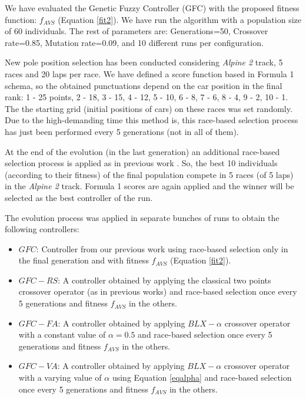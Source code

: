 \documentclass[conference]{IEEEtran}
\begin{document}
We have evaluated the Genetic Fuzzy Controller (GFC) with the proposed fitness function: $f_{AVS}$ (Equation \ref{fit2}). We have run the algorithm with a population size of 60 individuals. The rest of parameters are: Generations=50, Crossover rate=0.85, Mutation rate=0.09, and 10 different runs per configuration.

New pole position selection has been conducted considering \textit{Alpine 2} track, 5 races and 20 laps per race. 
We have defined a score function based in Formula 1 schema, so the obtained punctuations depend on the car position in the final rank: 1 - 25 points, 2 - 18, 3 - 15, 4 - 12, 5 - 10, 6 - 8, 7 - 6, 8 - 4, 9 - 2, 10 - 1. The the starting grid (initial positions of cars) on these races was set randomly.
Due to the high-demanding time this method is, this race-based selection process has just been performed every 5 generations (not in all of them).

At the end of the evolution (in the last generation) an additional race-based selection process is applied as in previous work \cite{salem_cig2018}. So, the best 10 individuals (according to their fitness) of the final population compete in 5 races (of 5 laps) in the \textit{Alpine 2} track. Formula 1 scores are again applied and the winner will be selected as the best controller of the run.

The evolution process was applied in separate bunches of runs to obtain the following controllers:
\begin{itemize}
	\item $GFC$: Controller  from our previous work \cite{salem_cig2018} 
using race-based selection only in the final generation and with fitness  $f_{AVS}$ (Equation \ref{fit2}).
	\item $GFC-RS$: A controller obtained by applying the classical two points crossover operator (as in previous works) and race-based selection once every 5 generations and fitness $f_{AVS}$ in the others. 
	\item $GFC-FA$: A controller obtained by applying $BLX-\alpha$ crossover operator with a constant value of $\alpha=0.5$ and race-based selection once every 5 generations and fitness $f_{AVS}$ in the others. 
	\item $GFC-VA$: A controller obtained by applying $BLX-\alpha$ crossover operator with a varying value of $\alpha$ using Equation \ref{eqalpha} and race-based selection once every 5 generations and fitness $f_{AVS}$ in the others. 
\end{itemize}
\end{document}
